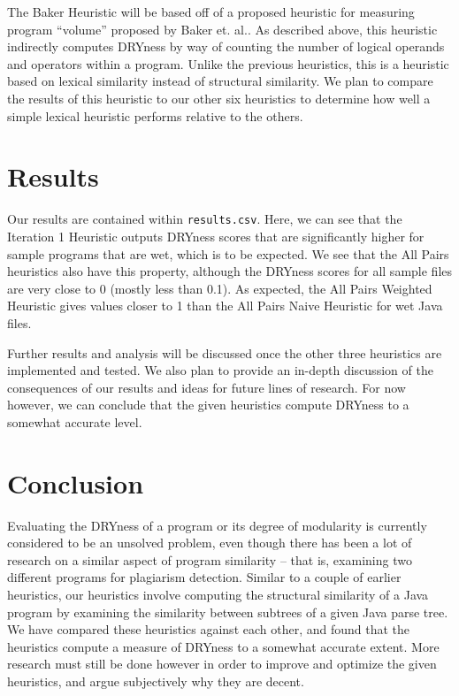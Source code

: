 \documentclass{article}
\begin{document}
The Baker Heuristic will be based off of a proposed heuristic for measuring program ``volume'' proposed
by Baker et. al.\cite{Modularity1979}. As described above, this heuristic indirectly computes DRYness by way of counting the
number of logical operands and operators within a program. Unlike the previous heuristics, this is a heuristic based on
lexical similarity instead of structural similarity. We plan to compare the results of this heuristic to our other six
heuristics to determine how well a simple lexical heuristic performs relative to the others.

\section{Results}

Our results are contained within \texttt{results.csv}. Here, we can see that the Iteration 1 Heuristic outputs DRYness scores
that are significantly higher for sample programs that are wet, which is to be expected. We see that the All Pairs
heuristics also have this property, although the DRYness scores for all sample files are very close to 0 (mostly less than 0.1).
As expected, the All Pairs Weighted Heuristic gives values closer to 1 than the All Pairs Naive Heuristic for wet Java files.

Further results and analysis will be discussed once the other three heuristics are implemented and tested. We also plan to
provide an in-depth discussion of the consequences of our results and ideas for future lines of research. For now however,
we can conclude that the given heuristics compute DRYness to a somewhat accurate level.

\section{Conclusion}

Evaluating the DRYness of a program or its degree of modularity is currently considered to be an unsolved problem,
even though there has been a lot of research on a similar aspect of program similarity -- that is, examining two
different programs for plagiarism detection. Similar to a couple of earlier heuristics, our heuristics involve
computing the structural similarity of a Java program by examining the similarity between subtrees of a given Java parse tree. 
We have compared these heuristics against each other, and found that the heuristics compute a measure of DRYness to a 
somewhat accurate extent. More research must still be done however in order to
improve and optimize the given heuristics, and argue subjectively why they are decent.
\end{document}
